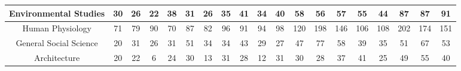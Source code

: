 \documentclass[10]{article}
\begin{document}
\begin{landscape}
\begin{longtable}[c]{|ccccccccccccccccccc|}
	\multicolumn{1}{|c|}{Environmental Studies}                      & \multicolumn{1}{c|}{30}         & \multicolumn{1}{c|}{26}         & \multicolumn{1}{c|}{22}         & \multicolumn{1}{c|}{38}         & \multicolumn{1}{c|}{31}         & \multicolumn{1}{c|}{26}         & \multicolumn{1}{c|}{35}         & \multicolumn{1}{c|}{41}         & \multicolumn{1}{c|}{34}         & \multicolumn{1}{c|}{40}         & \multicolumn{1}{c|}{58}         & \multicolumn{1}{c|}{56}         & \multicolumn{1}{c|}{57}         & \multicolumn{1}{c|}{55}         & \multicolumn{1}{c|}{44}         & \multicolumn{1}{c|}{87}         & \multicolumn{1}{c|}{87}         & 91         \\ \hline
	\multicolumn{1}{|c|}{Human Physiology}                           & \multicolumn{1}{c|}{71}         & \multicolumn{1}{c|}{79}         & \multicolumn{1}{c|}{90}         & \multicolumn{1}{c|}{70}         & \multicolumn{1}{c|}{87}         & \multicolumn{1}{c|}{82}         & \multicolumn{1}{c|}{96}         & \multicolumn{1}{c|}{91}         & \multicolumn{1}{c|}{94}         & \multicolumn{1}{c|}{98}         & \multicolumn{1}{c|}{120}        & \multicolumn{1}{c|}{198}        & \multicolumn{1}{c|}{146}        & \multicolumn{1}{c|}{106}        & \multicolumn{1}{c|}{108}        & \multicolumn{1}{c|}{202}        & \multicolumn{1}{c|}{174}        & 151        \\ \hline
	\multicolumn{1}{|c|}{General Social Science}                     & \multicolumn{1}{c|}{20}         & \multicolumn{1}{c|}{31}         & \multicolumn{1}{c|}{26}         & \multicolumn{1}{c|}{31}         & \multicolumn{1}{c|}{51}         & \multicolumn{1}{c|}{34}         & \multicolumn{1}{c|}{34}         & \multicolumn{1}{c|}{43}         & \multicolumn{1}{c|}{29}         & \multicolumn{1}{c|}{27}         & \multicolumn{1}{c|}{47}         & \multicolumn{1}{c|}{77}         & \multicolumn{1}{c|}{58}         & \multicolumn{1}{c|}{39}         & \multicolumn{1}{c|}{35}         & \multicolumn{1}{c|}{51}         & \multicolumn{1}{c|}{67}         & 53         \\ \hline
	\multicolumn{1}{|c|}{Architecture}                               & \multicolumn{1}{c|}{20}         & \multicolumn{1}{c|}{22}         & \multicolumn{1}{c|}{6}          & \multicolumn{1}{c|}{24}         & \multicolumn{1}{c|}{30}         & \multicolumn{1}{c|}{13}         & \multicolumn{1}{c|}{31}         & \multicolumn{1}{c|}{28}         & \multicolumn{1}{c|}{12}         & \multicolumn{1}{c|}{31}         & \multicolumn{1}{c|}{30}         & \multicolumn{1}{c|}{28}         & \multicolumn{1}{c|}{37}         & \multicolumn{1}{c|}{41}         & \multicolumn{1}{c|}{25}         & \multicolumn{1}{c|}{49}         & \multicolumn{1}{c|}{55}         & 40         \\ \hline

\end{longtable}
\end{landscape}
\end{document}
